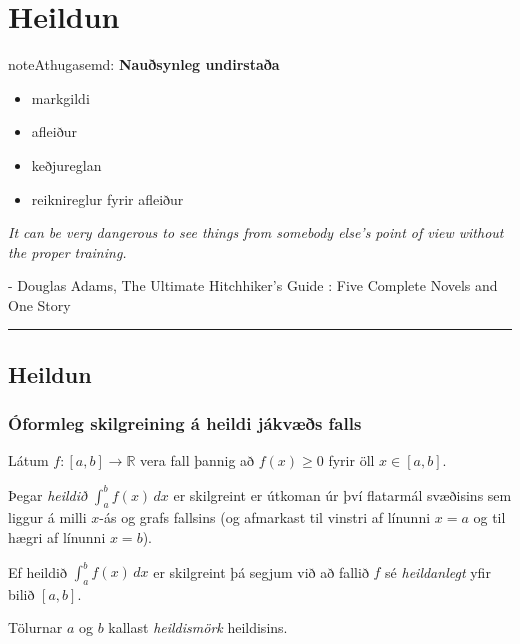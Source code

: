 \documentclass[b5paper,10pt,icelandic]{sphinxmanual}
\begin{document}
\chapter{Heildun}
\label{kafli06::doc}\label{kafli06:heildun}
\begin{notice}{note}{Athugasemd:}
\textbf{Nauðsynleg undirstaða}
\begin{itemize}
\item {} 
markgildi

\item {} 
afleiður

\item {} 
keðjureglan

\item {} 
reiknireglur fyrir afleiður

\end{itemize}
\end{notice}

\emph{It can be very dangerous to see things from somebody else's point of view without the proper training.}

- Douglas Adams, The Ultimate Hitchhiker's Guide : Five Complete Novels and One Story


\bigskip\hrule{}\bigskip



\section{Heildun}
\label{kafli06:id1}

\subsection{Óformleg skilgreining á heildi jákvæðs falls}
\label{kafli06:oformleg-skilgreining-a-heildi-jakvaes-falls}
Látum \(f:[a,b]\rightarrow {{\mathbb  R}}\) vera fall þannig að
\(f(x)\geq 0\) fyrir öll \(x\in[a,b]\).

Þegar \textit{heildið} \(\int_a^b f(x)\,dx\) er skilgreint er útkoman úr því
flatarmál svæðisins sem liggur á milli \(x\)-ás og grafs fallsins
(og afmarkast til vinstri af línunni \(x=a\) og til hægri af línunni
\(x=b\)).

Ef heildið \(\int_a^b f(x)\,dx\) er skilgreint þá segjum við að
fallið \(f\) sé \textit{heildanlegt} yfir bilið \([a,b]\).

Tölurnar \(a\) og \(b\) kallast \textit{heildismörk} heildisins.
\end{document}
